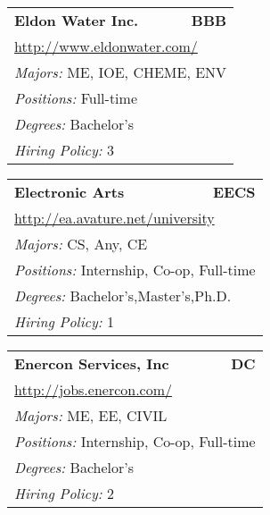\documentclass[twoside]{article}
\begin{document}
\begin{center}
\begin{multicols}{3}
\begin{FlushLeft}
\begin{minipage}{.9\columnwidth}
\end{minipage}
 
\begin{minipage}{.9\columnwidth}\begin{tabularx}{.95\columnwidth}{Xr}
                 {\Large\bf Eldon Water Inc.} & {\Large\bf BBB}\\
    \multicolumn{2}{p{.95\columnwidth}}{\url{http://www.eldonwater.com/}}\\
    \multicolumn{2}{p{.95\columnwidth}}{\emph{Majors:} ME, IOE, CHEME, ENV}\\
    \multicolumn{2}{p{.95\columnwidth}}{\emph{Positions:} Full-time}\\
    \multicolumn{2}{p{.95\columnwidth}}{\emph{Degrees:} Bachelor's}\\
    \multicolumn{2}{p{.95\columnwidth}}{\emph{Hiring Policy:} 3}\\
    \end{tabularx}
    
\end{minipage}
 
\begin{minipage}{.9\columnwidth}\begin{tabularx}{.95\columnwidth}{Xr}
                 {\Large\bf Electronic Arts} & {\Large\bf EECS}\\
    \multicolumn{2}{p{.95\columnwidth}}{\url{http://ea.avature.net/university}}\\
    \multicolumn{2}{p{.95\columnwidth}}{\emph{Majors:} CS, Any, CE}\\
    \multicolumn{2}{p{.95\columnwidth}}{\emph{Positions:} Internship, Co-op, Full-time}\\
    \multicolumn{2}{p{.95\columnwidth}}{\emph{Degrees:} Bachelor's,Master's,Ph.D.}\\
    \multicolumn{2}{p{.95\columnwidth}}{\emph{Hiring Policy:} 1}\\
    \end{tabularx}
    
\end{minipage}
 
\begin{minipage}{.9\columnwidth}\begin{tabularx}{.95\columnwidth}{Xr}
                 {\Large\bf Enercon Services, Inc} & {\Large\bf DC}\\
    \multicolumn{2}{p{.95\columnwidth}}{\url{http://jobs.enercon.com/}}\\
    \multicolumn{2}{p{.95\columnwidth}}{\emph{Majors:} ME, EE, CIVIL}\\
    \multicolumn{2}{p{.95\columnwidth}}{\emph{Positions:} Internship, Co-op, Full-time}\\
    \multicolumn{2}{p{.95\columnwidth}}{\emph{Degrees:} Bachelor's}\\
    \multicolumn{2}{p{.95\columnwidth}}{\emph{Hiring Policy:} 2}\\
    \end{tabularx}
    

\end{minipage}
\end{FlushLeft}
\end{multicols}
\end{center}
\end{document}
